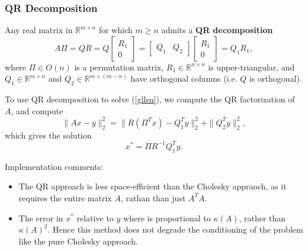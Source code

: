 \documentclass[reqno]{amsart}
\numberwithin{equation}{section}
\begin{document}
\subsubsection{QR Decomposition}
Any real matrix in $\mathbb R^{m \times n}$ for which $m \ge n$ admits
a \textbf{QR decomposition}
    $$
        A\Pi = QR = Q \begin{bmatrix} R_1 \\ 0 \end{bmatrix}
            = \begin{bmatrix} Q_1 & Q_2 \end{bmatrix}
                \begin{bmatrix} R_1 \\ 0 \end{bmatrix}
                    = Q_1 R_1,
    $$
where $\Pi \in O(n)$ is a permutation matrix,
$R_1 \in \mathbb R^{n \times n}$ is upper-triangular, and
$Q_1 \in \mathbb R^{m \times n}$ and $Q_2 \in \mathbb R^{m \times(m-n)}$
have orthogonal columns (i.e. $Q$ is orthogonal).

To use QR decomposition to solve (\ref{gllsn}), we compute the QR factorization of $A$,
and compute
$$
    \|Ax - y\|_2^2 = \| R(\Pi^Tx) - Q_1^Ty\|_2^2 + \|Q_2^Ty\|_2^2,
$$
which gives the solution
$$
    x^* = \Pi R^{-1} Q_1^Ty.
$$

Implementation comments:
\begin{itemize}
    \item The QR approach is less space-efficient than the Cholesky appraoch, as it requires
        the entire matrix $A$, rathan than just $A^TA$.
    \item The error in $x^*$ relative to $y$ where is proportional to $\kappa(A)$,
    rather
    than $\kappa(A)^2$. Hence this method does not degrade the conditioning of the problem like
    the pure Cholesky approach.
\end{itemize}
\end{document}
